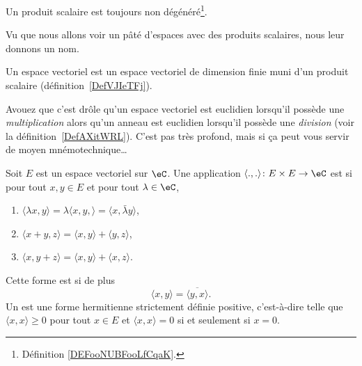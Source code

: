\begin{lemma}       \label{LEMooLPUFooVCvnwW}
    Un produit scalaire est toujours non dégénéré\footnote{Définition \ref{DEFooNUBFooLfCqaK}.}.
\end{lemma}


Vu que nous allons voir un pâté d'espaces avec des produits scalaires, nous leur donnons un nom.
\begin{definition}\label{DefLZMcvfj} 
    Un espace vectoriel  est un espace vectoriel de dimension finie muni d'un produit scalaire (définition~\ref{DefVJIeTFj}).
\end{definition}
Avouez que c'est drôle qu'un espace vectoriel est euclidien lorsqu'il possède une \emph{multiplication} alors qu'un anneau est euclidien lorsqu'il possède une \emph{division} (voir la définition~\ref{DefAXitWRL}). C'est pas très profond, mais si ça peut vous servir de moyen mnémotechnique\ldots

\begin{definition}  \label{DefMZQxmQ}
    Soit \( E\) est un espace vectoriel sur \( \eC\). Une application \( \langle ., .\rangle \colon E\times E\to \eC\) est  si pour tout \( x,y\in E\) et pour tout \( \lambda\in \eC\),
    \begin{enumerate}
        \item
            \( \langle \lambda x, y\rangle =\lambda\langle x,y, \rangle =\langle x, \bar\lambda y\rangle \),
        \item
            \( \langle x+y, z\rangle =\langle x, y\rangle+\langle y, z\rangle  \),
        \item
            \( \langle x, y+z\rangle =\langle x, y\rangle +\langle x, z\rangle \).
    \end{enumerate}
    Cette forme est  si de plus
    \begin{equation}
        \langle x, y\rangle =\overline{ \langle y, x\rangle  }.
    \end{equation}
    Un  est une forme hermitienne strictement définie positive, c'est-à-dire telle que \( \langle x, x\rangle \geq 0\) pour tout \( x\in E\) et \( \langle x, x\rangle =0\) si et seulement si \( x=0\).
\end{definition}

